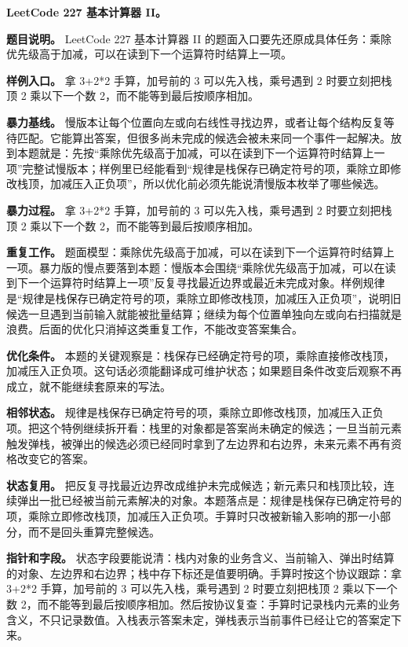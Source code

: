 \noindent\textbf{LeetCode 227 基本计算器 II。}

\textbf{题目说明。} LeetCode 227 基本计算器 II 的题面入口要先还原成具体任务：乘除优先级高于加减，可以在读到下一个运算符时结算上一项。

\textbf{样例入口。} 拿 3+2*2 手算，加号前的 3 可以先入栈，乘号遇到 2 时要立刻把栈顶 2 乘以下一个数 2，而不能等到最后按顺序相加。

\textbf{暴力基线。} 慢版本让每个位置向左或向右线性寻找边界，或者让每个结构反复等待匹配。它能算出答案，但很多尚未完成的候选会被未来同一个事件一起解决。放到本题就是：先按“乘除优先级高于加减，可以在读到下一个运算符时结算上一项”完整试慢版本；样例里已经能看到“规律是栈保存已确定符号的项，乘除立即修改栈顶，加减压入正负项”，所以优化前必须先能说清慢版本枚举了哪些候选。

\textbf{暴力过程。} 拿 3+2*2 手算，加号前的 3 可以先入栈，乘号遇到 2 时要立刻把栈顶 2 乘以下一个数 2，而不能等到最后按顺序相加。

\textbf{重复工作。} 题面模型：乘除优先级高于加减，可以在读到下一个运算符时结算上一项。暴力版的慢点要落到本题：慢版本会围绕“乘除优先级高于加减，可以在读到下一个运算符时结算上一项”反复寻找最近边界或最近未完成对象。样例规律是“规律是栈保存已确定符号的项，乘除立即修改栈顶，加减压入正负项”，说明旧候选一旦遇到当前输入就能被批量结算；继续为每个位置单独向左或向右扫描就是浪费。后面的优化只消掉这类重复工作，不能改变答案集合。

\textbf{优化条件。} 本题的关键观察是：栈保存已经确定符号的项，乘除直接修改栈顶，加减压入正负项。这句话必须能翻译成可维护状态；如果题目条件改变后观察不再成立，就不能继续套原来的写法。

\textbf{相邻状态。} 规律是栈保存已确定符号的项，乘除立即修改栈顶，加减压入正负项。把这个特例继续拆开看：栈里的对象都是答案尚未确定的候选；一旦当前元素触发弹栈，被弹出的候选必须已经同时拿到了左边界和右边界，未来元素不再有资格改变它的答案。

\textbf{状态复用。} 把反复寻找最近边界改成维护未完成候选；新元素只和栈顶比较，连续弹出一批已经被当前元素解决的对象。本题落点是：规律是栈保存已确定符号的项，乘除立即修改栈顶，加减压入正负项。手算时只改被新输入影响的那一小部分，而不是回头重算完整候选。

\textbf{指针和字段。} 状态字段要能说清：栈内对象的业务含义、当前输入、弹出时结算的对象、左边界和右边界；栈中存下标还是值要明确。手算时按这个协议跟踪：拿 3+2*2 手算，加号前的 3 可以先入栈，乘号遇到 2 时要立刻把栈顶 2 乘以下一个数 2，而不能等到最后按顺序相加。然后按协议复查：手算时记录栈内元素的业务含义，不只记录数值。入栈表示答案未定，弹栈表示当前事件已经让它的答案定下来。

